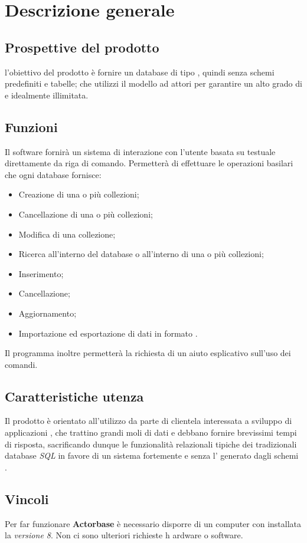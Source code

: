 \documentclass{scalatekids-article}
\begin{document}
\section{Descrizione generale}
\subsection{Prospettive del prodotto}
l'obiettivo del prodotto è fornire un database  di tipo
, quindi senza schemi predefiniti e tabelle; che utilizzi il
modello ad attori per garantire un alto grado di  e
 idealmente illimitata.
\subsection{Funzioni}
Il software fornirà un sistema di interazione con l'utente basata su 
testuale direttamente da riga di comando. Permetterà di effettuare le operazioni
basilari che ogni database fornisce:
\begin{itemize}
\item Creazione di una o più collezioni;
\item Cancellazione di una o più collezioni;
\item Modifica di una collezione;
\item Ricerca all'interno del database o all'interno di una o più collezioni;
\item Inserimento;
\item Cancellazione;
\item Aggiornamento;
\item Importazione ed esportazione di dati in formato . %
\end{itemize}
Il programma inoltre permetterà la richiesta di un aiuto esplicativo sull'uso
dei comandi.
\subsection{Caratteristiche utenza}
Il prodotto è orientato all'utilizzo da parte di clientela interessata a
sviluppo di applicazioni , che trattino grandi moli di dati e
debbano fornire brevissimi tempi di risposta, sacrificando dunque le
funzionalità relazionali tipiche dei tradizionali database \textit{SQL} in
favore di un sistema fortemente  e senza l' generato
dagli schemi .
\subsection{Vincoli}
Per far funzionare \textbf{Actorbase} è necessario disporre di un computer con
installata la \textit{ versione 8}. Non ci sono ulteriori richieste h
ardware o software.
\end{document}
